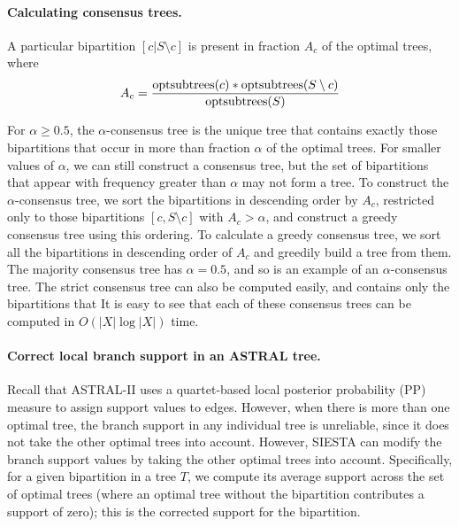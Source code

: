 \paragraph{Calculating consensus trees. }

A particular bipartition $[c|S \setminus c]$ is present in fraction $A_c$ of the optimal trees, where 
\begin{equation}
  A_c = \frac{\mathop{\rm optsubtrees}(c) * \mathop{\rm optsubtrees} (S\setminus c)}{\mathop{\rm optsubtrees}(S)}
\end{equation}
 

For $\alpha \geq 0.5$, the $\alpha$-consensus tree is the unique tree that contains exactly those bipartitions that occur in more than fraction $\alpha $ of the optimal trees.
For smaller values of $\alpha$, we can still construct a consensus tree, but the set of bipartitions that appear with frequency greater than $\alpha$ may not form a tree.
To construct the $\alpha$-consensus tree, we  sort the bipartitions in descending order by  $A_c$, restricted only to those bipartitions $[c,S\setminus c]$  with $A_c> \alpha$, and construct a greedy consensus tree using this ordering.   
To calculate a greedy consensus tree, we sort all the bipartitions in descending order of $A_c$ and greedily build a tree from them.
The majority consensus tree has $\alpha=0.5$, and so is an example of an $\alpha$-consensus tree.
The strict consensus tree can also be computed easily, and contains only the bipartitions that 
It is easy to see that each of these consensus trees can be computed in  $O(|X| \log |X|)$ time.

\paragraph{Correct local branch support in an ASTRAL tree. }

Recall that ASTRAL-II uses a quartet-based local posterior probability (PP) measure \cite{sayyari2016fast} to assign support values to edges.
However, when there is more than one optimal tree, the branch support in any individual tree is unreliable, since it does not take the other optimal trees into account.
However,  SIESTA can modify the branch support values by taking the other optimal trees into account. 
Specifically, for a given bipartition in a tree $T$,  we compute its average support across the set of optimal trees (where an optimal tree without the bipartition contributes a support of zero); this is the corrected support for the bipartition.


